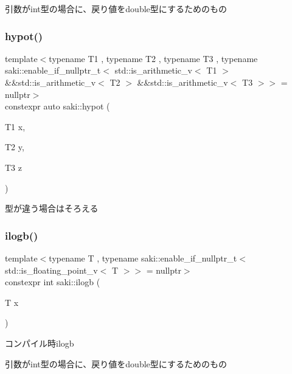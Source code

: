 引数がint型の場合に、戻り値をdouble型にするためのもの 

\mbox{\label{namespacesaki_a210e4f63ae8c3ff62e53396f8ba45d91}} 
\subsubsection{\texorpdfstring{hypot()}{hypot()}\hspace{0.1cm}{\footnotesize\ttfamily [6/6]}}
{\footnotesize\ttfamily template$<$typename T1 , typename T2 , typename T3 , typename saki\+::enable\+\_\+if\+\_\+nullptr\+\_\+t$<$ std\+::is\+\_\+arithmetic\+\_\+v$<$ T1 $>$ \&\&std\+::is\+\_\+arithmetic\+\_\+v$<$ T2 $>$ \&\&std\+::is\+\_\+arithmetic\+\_\+v$<$ T3 $>$$>$  = nullptr$>$ \\
constexpr auto saki\+::hypot (\begin{DoxyParamCaption}\item[{T1}]{x,  }\item[{T2}]{y,  }\item[{T3}]{z }\end{DoxyParamCaption})}



型が違う場合はそろえる 

\mbox{\label{namespacesaki_a582e9de82aa8572287c01530ae2626a8}} 
\subsubsection{\texorpdfstring{ilogb()}{ilogb()}}
{\footnotesize\ttfamily template$<$typename T , typename saki\+::enable\+\_\+if\+\_\+nullptr\+\_\+t$<$ std\+::is\+\_\+floating\+\_\+point\+\_\+v$<$ T $>$$>$  = nullptr$>$ \\
constexpr int saki\+::ilogb (\begin{DoxyParamCaption}\item[{T}]{x }\end{DoxyParamCaption})}



コンパイル時ilogb 

引数がint型の場合に、戻り値をdouble型にするためのもの \mbox{\label{namespacesaki_a52a09941a80893dfdea6da4c220fba08}} 
